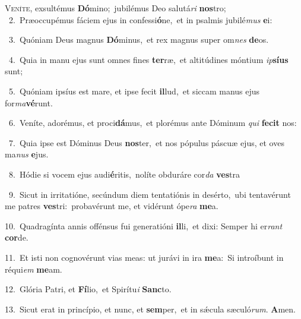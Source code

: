 \lettrine{\initial\textcolor{\initialcolor}{V}}{eníte,} exsultémus \textbf{Dó}\-mino;~\star jubilémus Deo salutá\textit{ri} \textbf{nos}\-tro;\\
{\numbfont\textcolor{\numbcolor}{~2.}}~Præoccupémus fáciem ejus in confessi\-\textbf{ó}\-ne,~\star et in psalmis jubilé\textit{mus} \textbf{e}\-i:\par
{\numbfont\textcolor{\numbcolor}{~3.}}~Quóniam Deus magnus \textbf{Dó}\-minus,~\star et rex magnus super om\textit{nes} \textbf{de}\-os.\par
{\numbfont\textcolor{\numbcolor}{~4.}}~Quia in manu ejus sunt omnes fines \textbf{ter}\-ræ,~\star et altitúdines móntium \textit{ip}\-\textbf{sí}\textbf{us} sunt;\par
{\numbfont\textcolor{\numbcolor}{~5.}}~Quóniam ipsíus est mare, et ipse fecit \textbf{il}\-lud,~\star et siccam manus ejus for\-\textit{ma}\-\textbf{vé}runt.\par
{\numbfont\textcolor{\numbcolor}{~6.}}~Veníte, adorémus, et proci\-\textbf{dá}\-mus,~\star et plorémus ante Dóminum \textit{qui} \textbf{fe}\-\textbf{cit} nos:\par
{\numbfont\textcolor{\numbcolor}{~7.}}~Quia ipse est Dóminus Deus \textbf{nos}\-ter,~\star et nos pópulus páscuæ ejus, et oves ma\textit{nus} \textbf{e}\-jus.\par
{\numbfont\textcolor{\numbcolor}{~8.}}~Hódie si vocem ejus audi\-\textbf{é}\-ritis,~\star nolíte obduráre cor\textit{da} \textbf{ves}\-tra\par
{\numbfont\textcolor{\numbcolor}{~9.}}~Sicut in irritatióne, secúndum diem tentatiónis in desérto,~\dagger ubi tentavérunt me patres \textbf{ves}\-tri:~\star probavérunt me, et vidérunt ópe\textit{ra} \textbf{me}\-a.\par
{\numbfont\textcolor{\numbcolor}{10.}}~Quadragínta annis offénsus fui generatióni \textbf{il}\-li,~\star et dixi: Semper hi er\textit{rant} \textbf{cor}\-de.\par
{\numbfont\textcolor{\numbcolor}{11.}}~Et isti non cognovérunt vias meas: ut jurávi in ira \textbf{me}\-a:~\star Si introíbunt in réqui\textit{em} \textbf{me}\-am.\par
{\numbfont\textcolor{\numbcolor}{12.}}~Glória Patri, et \textbf{Fí}\-lio,~\star et Spirítu\textit{i} \textbf{Sanc}\-to.\par
{\numbfont\textcolor{\numbcolor}{13.}}~Sicut erat in princípio, et nunc, et \textbf{sem}\-per,~\star et in sǽcula sæculó\-\textit{rum}\-. \textbf{A}\-men.\par
